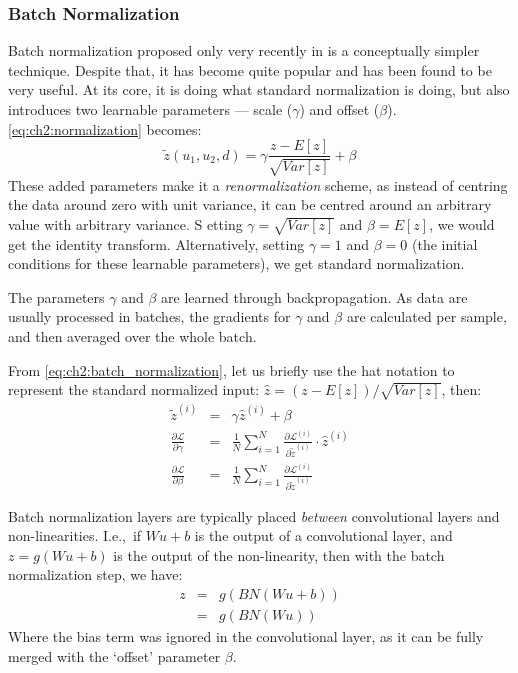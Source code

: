 \subsubsection{Batch Normalization}
      Batch normalization proposed only very recently in
      \citep{ioffe_batch_2015} is a conceptually simpler technique. Despite
      that, it has become quite popular and has been found to be very useful.
      At its core, it is doing what standard normalization is doing, but also
      introduces two learnable parameters --- scale ($\gamma$) and offset
      ($\beta$). \eqref{eq:ch2:normalization} becomes:
      \begin{equation}
        \tilde{z}(u_1,u_2,d) = \gamma\frac{z-E[z]}{\sqrt{Var[z]}} + \beta 
				\label{eq:ch2:batch_normalization}
      \end{equation}
      These added parameters make it a \emph{renormalization} scheme, as instead of
      centring the data around zero with unit variance, it can be centred
      around an arbitrary value with arbitrary variance. S etting
      $\gamma = \sqrt{Var[z]}$ and $\beta = E[z]$, we would get the identity
      transform. Alternatively, setting $\gamma = 1$ and $\beta = 0$ (the
      initial conditions for these learnable parameters), we get standard
      normalization.
      
      The parameters $\gamma$ and $\beta$ are learned through backpropagation.
      As data are usually processed in batches, the gradients for $\gamma$ and
      $\beta$ are calculated per sample, and then averaged over the whole
      batch.

      From \autoref{eq:ch2:batch_normalization}, let us briefly use the hat
      notation to represent the standard normalized input:
      $\hat{z} = (z-E[z])/\sqrt{Var[z]}$, then:
      \begin{eqnarray}
        \tilde{z}^{(i)} & = & \gamma \hat{z}^{(i)} + \beta \nonumber\\
        \frac{\partial \mathcal{L}}{\partial \gamma}& =&
        \frac{1}{N}\sum_{i=1}^{N} \frac{\partial
        \mathcal{L}^{(i)}}{\partial \tilde{z}^{(i)}} \cdot \hat{z}^{(i)} \\
        \frac{\partial \mathcal{L}}{\partial \beta}& =&
        \frac{1}{N}\sum_{i=1}^{N} \frac{\partial
        \mathcal{L}^{(i)}}{\partial \tilde{z}^{(i)}} 
      \end{eqnarray}

      Batch normalization layers are typically placed \emph{between} convolutional layers
      and non-linearities. I.e.,\ if $Wu+b$ is the output of a convolutional
      layer, and $z=g(Wu+b)$ is the output of the non-linearity, then with the
      batch normalization step, we have:
      \begin{eqnarray}
        z &=& g(BN(Wu+b)) \nonumber\\
          &=& g(BN(Wu))
      \end{eqnarray}
      Where the bias term was ignored in the convolutional layer, as it can be
      fully merged with the `offset' parameter $\beta$.

